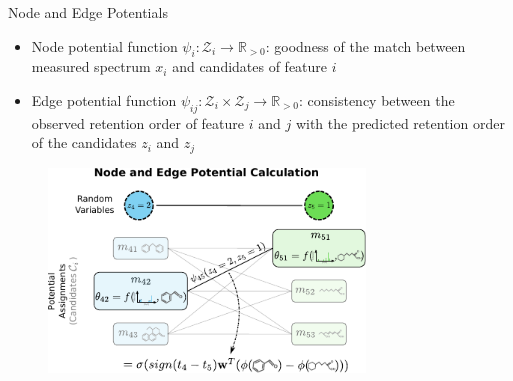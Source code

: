 \documentclass{beamer}
\begin{document}
\begin{frame}{}
\begin{columns}[T]
    \begin{block}{Node and Edge Potentials}
    \begin{itemize}
        \item Node potential function $\psi_i:\mathcal{Z}_i\rightarrow\mathbb{R}_{>0}$: goodness of the match between measured spectrum $x_i$ and candidates of feature $i$
        \item Edge potential function $\psi_{ij}:\mathcal{Z}_i\times\mathcal{Z}_j\rightarrow\mathbb{R}_{>0}$: consistency between the observed retention order of feature $i$ and $j$ with the predicted retention order of the candidates $z_i$ and $z_j$
    \end{itemize}
    \begin{figure}
        \centering
        \includegraphics[width=0.75\textwidth]{images/node_and_edge_scores.pdf}
    \end{figure}
    \end{block}





\end{columns}
\end{frame}
\end{document}
